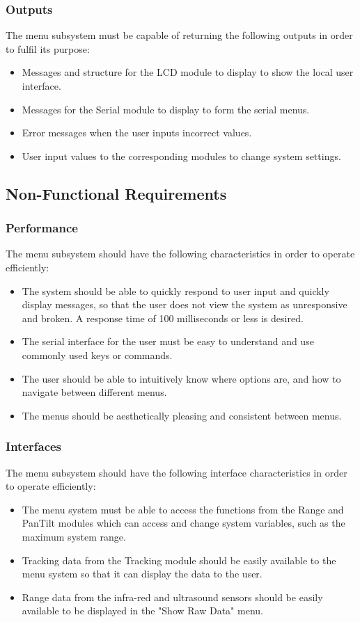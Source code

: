 \documentclass[]{report}
\begin{document}
\subsubsection{Outputs}
The menu subsystem must be capable of returning the following outputs in order to fulfil its purpose:
\begin{itemize}
	\item Messages and structure for the LCD module to display to show the local user interface.
	\item Messages for the Serial module to display to form the serial menus.
	\item Error messages when the user inputs incorrect values.
	\item User input values to the corresponding modules to change system settings. 
\end{itemize}

\subsection{Non-Functional Requirements}
\subsubsection{Performance}
The menu subsystem should have the following characteristics in order to operate efficiently:
\begin{itemize}
	\item The system should be able to quickly respond to user input and quickly display messages, so that the user does not view the system as unresponsive and broken. A response time of 100 milliseconds or less is desired. 
	\item The serial interface for the user must be easy to understand and use commonly used keys or commands. 
	\item The user should be able to intuitively know where options are, and how to navigate between different menus.
	\item The menus should be aesthetically pleasing and consistent between menus. 
\end{itemize}

\subsubsection{Interfaces}
The menu subsystem should have the following interface characteristics in order to operate efficiently:
\begin{itemize}
	\item The menu system must be able to access the functions from the Range and PanTilt modules which can access and change system variables, such as the maximum system range. 
	\item Tracking data from the Tracking module should be easily available to the menu system so that it can display the data to the user.
	\item Range data from the infra-red and ultrasound sensors should be easily available to be displayed in the "Show Raw Data" menu. 
\end{itemize}
\end{document}
